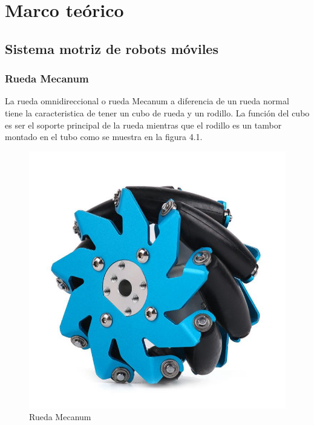 \documentclass[12pt]{book} %
\begin{document}
\chapter{Marco teórico} \label{cap.marco_teo}
 
	\section{Sistema motriz de robots móviles}
		
	\subsection{Rueda Mecanum}
La rueda omnidireccional o rueda Mecanum a diferencia de un rueda normal tiene la caracteristica de tener un cubo de rueda y un rodillo. La función del cubo es ser el soporte principal de la rueda mientras que el rodillo es un tambor montado en el tubo como se muestra en la figura 4.1.\\
\begin{figure}[H]
\centering
\includegraphics[scale=0.3]{Mecanum.jpg} 
\caption{Rueda Mecanum} 

\end{figure}
\end{document}
